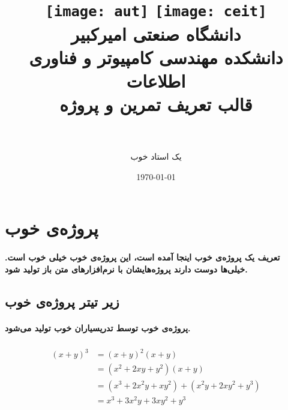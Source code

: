 \documentclass[paper=a4, fontsize=11pt]{article}
\title{
\normalfont \normalsize 
\texttt{[image: aut]}
\hspace{5cm}
\texttt{[image: ceit]} \\
\textsc دانشگاه صنعتی امیرکبیر \\
\textsc دانشکده مهندسی کامپیوتر و فناوری اطلاعات
\horrule{0.5pt} \\ [0.4cm] %
\huge قالب تعریف تمرین و پروژه \\ %
\horrule{2pt} \\ [0.5cm] %
}
\author{یک استاد خوب}
\date{\normalsize\today} %
\numberwithin{equation}{section} %
\numberwithin{figure}{section} %
\numberwithin{table}{section} %
\begin{document}
\maketitle %

\section{پروژه‌ی خوب}
\paragraph{
تعریف یک پروژه‌ی خوب اینجا آمده است، این پروژه‌ی خوب خیلی خوب است.
خیلی‌ها دوست دارند پروژه‌هایشان با نرم‌افزارهای متن باز تولید شود.
}
\subsection{زیر تیتر پروژه‌ی خوب}
\paragraph{
پروژه‌ی خوب توسط تدریسیاران خوب تولید می‌شود.
}

\begin{align} 
\begin{split}
(x+y)^3 	&= (x+y)^2(x+y)\\
&=(x^2+2xy+y^2)(x+y)\\
&=(x^3+2x^2y+xy^2) + (x^2y+2xy^2+y^3)\\
&=x^3+3x^2y+3xy^2+y^3
\end{split}					
\end{align}
\end{document}
